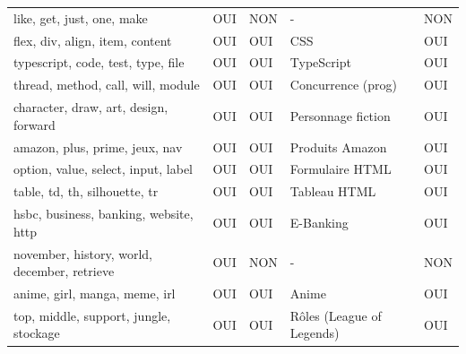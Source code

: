 \begin{longtable}{lllll}
\scriptsize like, get, just, one, make                         & \cellcolor[HTML]{9AFF99}OUI & \cellcolor[HTML]{FFCCC9}NON & -                         & \cellcolor[HTML]{FFCCC9}NON \\
\scriptsize flex, div, align, item, content                    & \cellcolor[HTML]{9AFF99}OUI & \cellcolor[HTML]{9AFF99}OUI & CSS                       & \cellcolor[HTML]{9AFF99}OUI \\
\scriptsize typescript, code, test, type, file                 & \cellcolor[HTML]{9AFF99}OUI & \cellcolor[HTML]{9AFF99}OUI & TypeScript                & \cellcolor[HTML]{9AFF99}OUI \\
\scriptsize thread, method, call, will, module                 & \cellcolor[HTML]{9AFF99}OUI & \cellcolor[HTML]{9AFF99}OUI & Concurrence (prog)        & \cellcolor[HTML]{9AFF99}OUI \\
\scriptsize character, draw, art, design, forward              & \cellcolor[HTML]{9AFF99}OUI & \cellcolor[HTML]{9AFF99}OUI & Personnage fiction        & \cellcolor[HTML]{9AFF99}OUI \\
\scriptsize amazon, plus, prime, jeux, nav                     & \cellcolor[HTML]{9AFF99}OUI & \cellcolor[HTML]{9AFF99}OUI & Produits Amazon           & \cellcolor[HTML]{9AFF99}OUI \\
\scriptsize option, value, select, input, label                & \cellcolor[HTML]{9AFF99}OUI & \cellcolor[HTML]{9AFF99}OUI & Formulaire HTML           & \cellcolor[HTML]{9AFF99}OUI \\
\scriptsize table, td, th, silhouette, tr                      & \cellcolor[HTML]{9AFF99}OUI & \cellcolor[HTML]{9AFF99}OUI & Tableau HTML              & \cellcolor[HTML]{9AFF99}OUI \\
\scriptsize hsbc, business, banking, website, http             & \cellcolor[HTML]{9AFF99}OUI & \cellcolor[HTML]{9AFF99}OUI & E-Banking                 & \cellcolor[HTML]{9AFF99}OUI \\
\scriptsize november, history, world, december, retrieve       & \cellcolor[HTML]{9AFF99}OUI & \cellcolor[HTML]{FFCCC9}NON & -                         & \cellcolor[HTML]{FFCCC9}NON \\
\scriptsize anime, girl, manga, meme, irl                      & \cellcolor[HTML]{9AFF99}OUI & \cellcolor[HTML]{9AFF99}OUI & Anime                     & \cellcolor[HTML]{9AFF99}OUI \\
\scriptsize top, middle, support, jungle, stockage             & \cellcolor[HTML]{9AFF99}OUI & \cellcolor[HTML]{9AFF99}OUI & Rôles (League of Legends) & \cellcolor[HTML]{9AFF99}OUI \\

\end{longtable}
